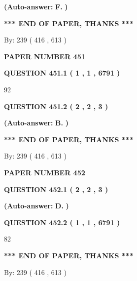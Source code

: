 \documentclass[12pt]{article}
\begin{document}
 
{\textbf{(Auto-answer:}}
{\textbf{\large{
F.}}}
{\textbf{)}}
 
 
   
   
   
   
\vspace{1.0in} 
{\textbf{\large{ *** END OF PAPER, THANKS *** }}} 
   
   
\hspace{1.0in} By: 
 239 ( 416 ,  613 )
   
   
   
   
\newpage 
\setcounter{page}{ 
   451001 } 
   
   
 {\textbf{ \Large{ PAPER NUMBER  451  }}}
   
   
   
   
  
  
{\textbf{\large{QUESTION
451.1 
 ( 1 , 1 , 6791 )
}}}

92
  
  
{\textbf{\large{QUESTION
451.2 
 ( 2 , 2 , 3 )
}}}
 
 
{\textbf{(Auto-answer:}}
{\textbf{\large{
B.}}}
{\textbf{)}}
 
 
   
   
   
   
\vspace{1.0in} 
{\textbf{\large{ *** END OF PAPER, THANKS *** }}} 
   
   
\hspace{1.0in} By: 
 239 ( 416 ,  613 )
   
   
   
   
\newpage 
\setcounter{page}{ 
   452001 } 
   
   
 {\textbf{ \Large{ PAPER NUMBER  452  }}}
   
   
   
   
  
  
{\textbf{\large{QUESTION
452.1 
 ( 2 , 2 , 3 )
}}}
 
 
{\textbf{(Auto-answer:}}
{\textbf{\large{
D.}}}
{\textbf{)}}
 
 
  
  
{\textbf{\large{QUESTION
452.2 
 ( 1 , 1 , 6791 )
}}}

82
   
   
   
   
\vspace{1.0in} 
{\textbf{\large{ *** END OF PAPER, THANKS *** }}} 
   
   
\hspace{1.0in} By: 
 239 ( 416 ,  613 )
   
   
   
\end{document}
